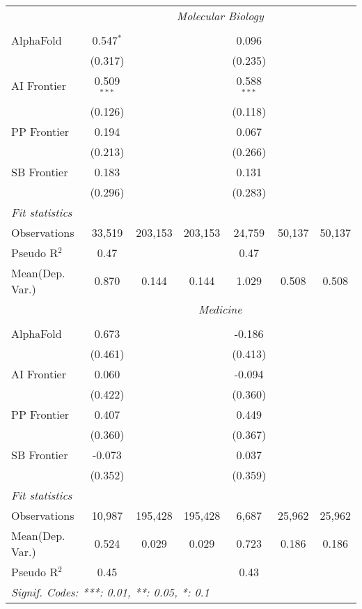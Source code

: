 \begin{tabular}{lcccccc}
 & \multicolumn{6}{c}{\textit{Molecular Biology}} \\ \\
   AlphaFold    & 0.547$^{*}$   &         &         & 0.096         &        &   \\   
                & (0.317)       &         &         & (0.235)       &        &   \\   
   AI Frontier  & 0.509$^{***}$ &         &         & 0.588$^{***}$ &        &   \\   
                & (0.126)       &         &         & (0.118)       &        &   \\   
   PP Frontier  & 0.194         &         &         & 0.067         &        &   \\   
                & (0.213)       &         &         & (0.266)       &        &   \\   
   SB Frontier  & 0.183         &         &         & 0.131         &        &   \\   
                & (0.296)       &         &         & (0.283)       &        &   \\   
   \midrule
   \emph{Fit statistics}\\
   Observations & 33,519        & 203,153 & 203,153 & 24,759        & 50,137 & 50,137\\  
   Pseudo R$^2$ & 0.47          &         &         & 0.47          &        & \\  
   
Mean(Dep. Var.) & 0.870 & 0.144 & 0.144 & 1.029 & 0.508 & 0.508 \\
 & \multicolumn{6}{c}{\textit{Medicine}} \\ \\
   AlphaFold    & 0.673    &         &         & -0.186  &        &   \\   
                & (0.461)  &         &         & (0.413) &        &   \\   
   AI Frontier  & 0.060    &         &         & -0.094  &        &   \\   
                & (0.422)  &         &         & (0.360) &        &   \\   
   PP Frontier  & 0.407    &         &         & 0.449   &        &   \\   
                & (0.360)  &         &         & (0.367) &        &   \\   
   SB Frontier  & -0.073   &         &         & 0.037   &        &   \\   
                & (0.352)  &         &         & (0.359) &        &   \\   
   \midrule
   \emph{Fit statistics}\\
   Observations & 10,987   & 195,428 & 195,428 & 6,687   & 25,962 & 25,962\\  
Mean(Dep. Var.) & 0.524 & 0.029 & 0.029 & 0.723 & 0.186 & 0.186 \\
   Pseudo R$^2$ & 0.45     &         &         & 0.43    &        & \\  
   \midrule \midrule
   \multicolumn{7}{l}{\emph{Signif. Codes: ***: 0.01, **: 0.05, *: 0.1}}\\
\end{tabular}
\par\endgroup
